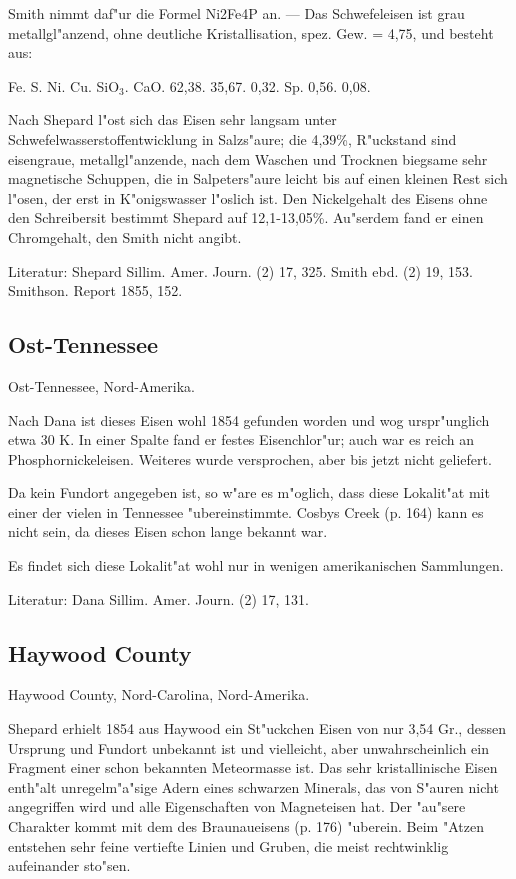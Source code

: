 \documentclass[a4paper, 11pt, oneside]{article}
\begin{document}
Smith nimmt daf"ur die Formel Ni2Fe4P an. --- Das Schwefeleisen ist grau metallgl"anzend, ohne deutliche Kristallisation, spez. Gew. = 4,75, und besteht aus:

Fe. S. Ni. Cu. SiO$_{3}$. CaO.
62,38. 35,67. 0,32. Sp. 0,56. 0,08.

Nach Shepard l"ost sich das Eisen sehr langsam unter Schwefelwasserstoffentwicklung in Salzs"aure; die 4,39\%, R"uckstand sind eisengraue, metallgl"anzende, nach dem Waschen und Trocknen biegsame sehr magnetische Schuppen, die in Salpeters"aure leicht bis auf einen kleinen Rest sich l"osen, der erst in K"onigswasser l"oslich ist. Den Nickelgehalt des Eisens ohne den Schreibersit bestimmt Shepard auf 12,1-13,05\%. Au"serdem fand er einen Chromgehalt, den Smith nicht angibt.

Literatur: Shepard Sillim. Amer. Journ. (2) 17, 325. Smith ebd. (2) 19, 153. Smithson. Report 1855, 152.

\subsection{Ost-Tennessee}

Ost-Tennessee, Nord-Amerika.

Nach Dana ist dieses Eisen wohl 1854 gefunden worden und wog urspr"unglich etwa 30 K. In einer Spalte fand er festes Eisenchlor"ur; auch war es reich an Phosphornickeleisen. Weiteres wurde versprochen, aber bis jetzt nicht geliefert.

Da kein Fundort angegeben ist, so w"are es m"oglich, dass diese Lokalit"at mit einer der vielen in Tennessee "ubereinstimmte. Cosbys Creek (p. 164) kann es nicht sein, da dieses Eisen schon lange bekannt war.

Es findet sich diese Lokalit"at wohl nur in wenigen amerikanischen Sammlungen.

Literatur: Dana Sillim. Amer. Journ. (2) 17, 131.

\subsection{Haywood County}

Haywood County, Nord-Carolina, Nord-Amerika.

Shepard erhielt 1854 aus Haywood ein St"uckchen Eisen von nur 3,54 Gr., dessen Ursprung und Fundort unbekannt ist und vielleicht, aber unwahrscheinlich ein Fragment einer schon bekannten Meteormasse ist. Das sehr kristallinische Eisen enth"alt unregelm"a"sige Adern eines schwarzen Minerals, das von S"auren nicht angegriffen wird und alle Eigenschaften von Magneteisen hat. Der "au"sere Charakter kommt mit dem des Braunaueisens (p. 176) "uberein. Beim "Atzen entstehen sehr feine vertiefte Linien und Gruben, die meist rechtwinklig aufeinander sto"sen.
\end{document}
